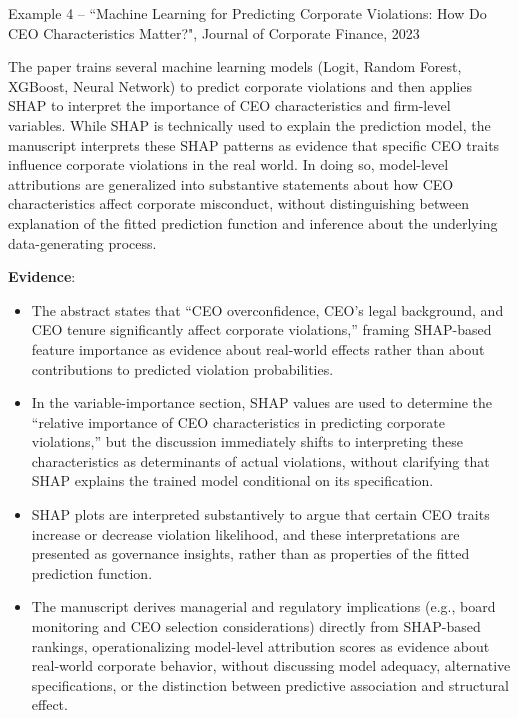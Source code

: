 \documentclass[11pt]{article}
\newcounter{se}[section]
\begin{document}
\begin{mainbox}{Example 4 – ``Machine Learning for Predicting Corporate Violations: How Do CEO Characteristics Matter?", Journal of Corporate Finance, 2023}

The paper trains several machine learning models (Logit, Random Forest, XGBoost, Neural Network) to predict corporate violations and then applies SHAP to interpret the importance of CEO characteristics and firm-level variables. While SHAP is technically used to explain the prediction model, the manuscript interprets these SHAP patterns as evidence that specific CEO traits influence corporate violations in the real world. In doing so, model-level attributions are generalized into substantive statements about how CEO characteristics affect corporate misconduct, without distinguishing between explanation of the fitted prediction function and inference about the underlying data-generating process.

\vspace{0.2cm}

\textbf{Evidence}:
\begin{itemize}

\item The abstract states that ``CEO overconfidence, CEO’s legal background, and CEO tenure significantly affect corporate violations,'' framing SHAP-based feature importance as evidence about real-world effects rather than about contributions to predicted violation probabilities.

\item In the variable-importance section, SHAP values are used to determine the ``relative importance of CEO characteristics in predicting corporate violations,'' but the discussion immediately shifts to interpreting these characteristics as determinants of actual violations, without clarifying that SHAP explains the trained model conditional on its specification.

\item SHAP plots are interpreted substantively to argue that certain CEO traits increase or decrease violation likelihood, and these interpretations are presented as governance insights, rather than as properties of the fitted prediction function.

\item The manuscript derives managerial and regulatory implications (e.g., board monitoring and CEO selection considerations) directly from SHAP-based rankings, operationalizing model-level attribution scores as evidence about real-world corporate behavior, without discussing model adequacy, alternative specifications, or the distinction between predictive association and structural effect.

\end{itemize}
\end{mainbox}
\end{document}
